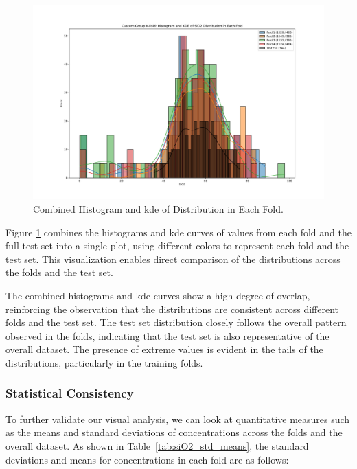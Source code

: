 \begin{figure}[h!]
    \centering
    \includegraphics[width=\textwidth]{images/histogram_kde_plot.png}
    \caption{Combined Histogram and \gls{kde} of  Distribution in Each Fold.}
    \label{fig:histogram_kde_plot}
\end{figure}

Figure \ref{fig:histogram_kde_plot} combines the histograms and \gls{kde} curves of  values from each fold and the full test set into a single plot, using different colors to represent each fold and the test set.
This visualization enables direct comparison of the distributions across the folds and the test set.

The combined histograms and \gls{kde} curves show a high degree of overlap, reinforcing the observation that the distributions are consistent across different folds and the test set.
The test set distribution closely follows the overall pattern observed in the folds, indicating that the test set is also representative of the overall dataset.
The presence of extreme values is evident in the tails of the distributions, particularly in the training folds.

\subsubsection{Statistical Consistency}

To further validate our visual analysis, we can look at quantitative measures such as the means and standard deviations of  concentrations across the folds and the overall dataset.
As shown in Table~\ref{tab:siO2_std_means}, the standard deviations and means for  concentrations in each fold are as follows:

